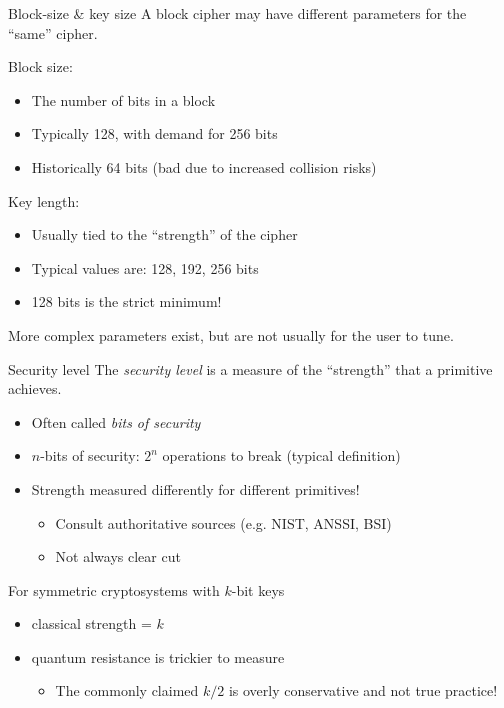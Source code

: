 \begin{frame}{Block-size \& key size}
  A block cipher may have different parameters for the \enquote{same} cipher.

  \pause
  Block size:
  \begin{itemize}
    \item The number of bits in a block
    \pause
    \item Typically 128, with demand for 256 bits
    \item Historically 64 bits (bad due to increased collision risks)
  \end{itemize}

  \pause
  Key length:
  \begin{itemize}
    \item Usually tied to the \enquote{strength} of the cipher
    \pause
    \item Typical values are: 128, 192, 256 bits
    \item 128 bits is the strict minimum!
  \end{itemize}

  \pause
  More complex parameters exist, but are not usually for the user to tune.
\end{frame}

\begin{frame}{Security level}
  \pause
  The \emph{security level} is a measure of the \enquote{strength} that a primitive achieves.

  \begin{itemize}[<+(1)->]
    \item Often called \emph{bits of security}
    \item $n$-bits of security: $2^n$ operations to break (typical definition)
    \item Strength measured differently for different primitives!
    \par
    \begin{itemize}
      \item Consult authoritative sources (e.g. NIST, ANSSI, BSI)
      \item Not always clear cut
    \end{itemize}
  \end{itemize}

  \pause
  For symmetric cryptosystems with $k$-bit keys
  \begin{itemize}[<+(1)->]
    \item classical strength = $k$
    \item quantum resistance is trickier to measure
    \par
    \begin{itemize}
      \item The commonly claimed $k/2$ is overly conservative and not true practice!
    \end{itemize}
  \end{itemize}
\end{frame}

